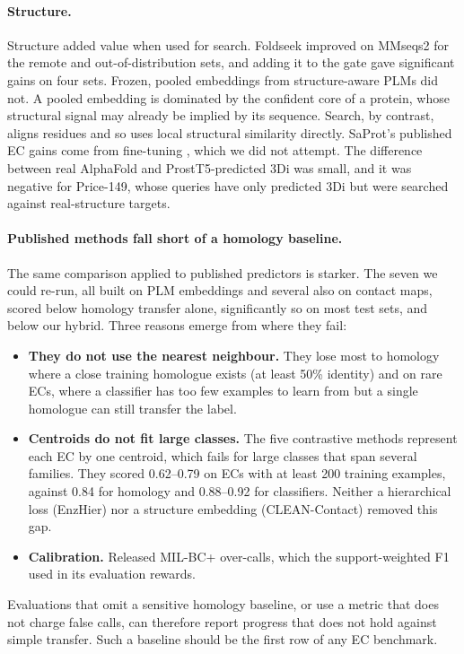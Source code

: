 \documentclass[11pt]{article}
\begin{document}
\paragraph{Structure.}
Structure added value when used for search. Foldseek improved on MMseqs2 for the remote and out-of-distribution sets,
and adding it to the gate gave significant gains on four sets. Frozen, pooled embeddings from structure-aware PLMs did
not. A pooled embedding is dominated by the confident core of a protein, whose structural signal may already be
implied by its sequence. Search, by contrast, aligns residues and so uses local structural similarity directly. SaProt's
published EC gains come from fine-tuning \cite{saprot}, which we did not attempt. The difference between real
AlphaFold and ProstT5-predicted 3Di was small, and it was negative for Price-149, whose queries have only predicted
3Di but were searched against real-structure targets.

\paragraph{Published methods fall short of a homology baseline.}
The same comparison applied to published predictors is starker. The seven we could re-run, all built on PLM
embeddings and several also on contact maps, scored below homology transfer alone, significantly so on most test sets, and
below our hybrid. Three reasons emerge from where they fail:
\begin{itemize}
  \item \textbf{They do not use the nearest neighbour.} They lose most to homology where a close training homologue
        exists (at least 50\% identity) and on rare ECs, where a classifier has too few examples to learn from but a
        single homologue can still transfer the label.
  \item \textbf{Centroids do not fit large classes.} The five contrastive methods represent each EC by one centroid,
        which fails for large classes that span several families. They scored 0.62--0.79 on ECs with at least 200
        training examples, against 0.84 for homology and 0.88--0.92 for classifiers. Neither a hierarchical loss
        (EnzHier) nor a structure embedding (CLEAN-Contact) removed this gap.
  \item \textbf{Calibration.} Released MIL-BC+ over-calls, which the support-weighted F1 used in its evaluation
        rewards.
\end{itemize}
Evaluations that omit a sensitive homology baseline, or use a metric that does not charge false calls, can therefore
report progress that does not hold against simple transfer. Such a baseline should be the first row of any EC
benchmark.
\end{document}
